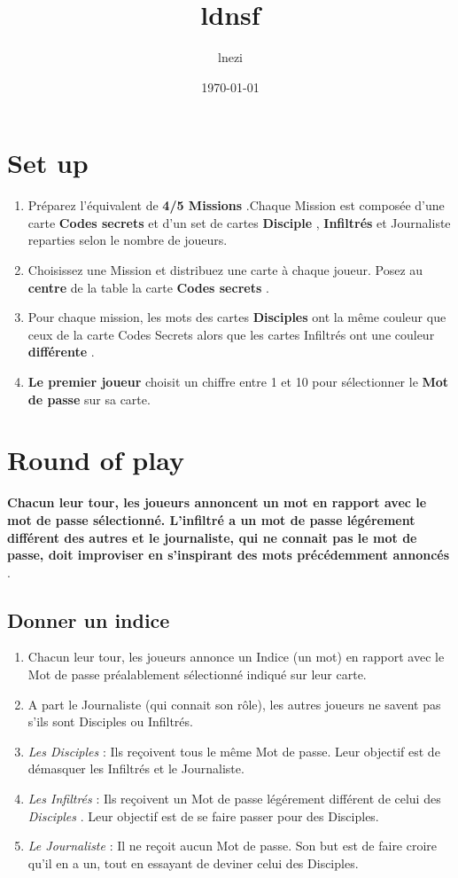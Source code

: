 \documentclass{article}%
\title{ldnsf}%
\author{lnezi}%
\date{\today}%
\begin{document}
%
\pagestyle{empty}%
\normalsize%
\maketitle%
\section{ Set up
}%
\label{sec:Setup}%
\begin{enumerate}%
\item%
%
 Préparez l'équivalent de  %
\textbf{4/5 Missions}%
.Chaque Mission est composée d'une carte %
\textbf{Codes secrets}%
 et d'un set de cartes  %
\textbf{Disciple}%
,%
\textbf{ Infiltrés}%
 et Journaliste reparties selon le nombre de joueurs.
\item%
%
 Choisissez une Mission et distribuez une carte à chaque joueur. Posez au  %
\textbf{centre}%
 de la table la carte  %
\textbf{Codes secrets}%
.
%
\item%
%
 Pour chaque mission, les mots des cartes  %
\textbf{Disciples}%
 ont la même couleur que ceux de la carte Codes Secrets alors que les cartes Infiltrés ont une couleur  %
\textbf{différente}%
.
%
\item%
%
\textbf{Le premier joueur}%
 choisit un chiffre entre 1 et 10 pour sélectionner le  %
\textbf{Mot de passe}%
 sur sa carte.
\end{enumerate}

%
\section{ Round of play
}%
\label{sec:Roundofplay}%
\textbf{Chacun leur tour, les joueurs annoncent un mot en rapport avec le mot de passe sélectionné. L'infiltré a un mot de passe légérement différent des autres et le journaliste, qui ne connait pas le mot de passe, doit improviser en s'inspirant des mots précédemment annoncés}%
.


%
\subsection{ Donner un indice
}%
\label{subsec:Donnerunindice}%
\begin{enumerate}%
\item%
%
 Chacun leur tour, les joueurs annonce un Indice (un mot) en rapport avec le Mot de passe préalablement sélectionné indiqué sur leur carte.
\item%
%
 A part le Journaliste (qui connait son rôle), les autres joueurs ne savent pas s'ils sont Disciples ou Infiltrés.
\item%
%
\textit{Les Disciples}%
 : Ils reçoivent tous le même Mot de passe. Leur objectif est de démasquer les Infiltrés et le Journaliste.
\item%
%
\textit{Les Infiltrés}%
 : Ils reçoivent un Mot de passe légérement différent de celui des  %
\textit{Disciples}%
. Leur objectif est de se faire passer pour des Disciples.
%
\item%
%
\textit{Le Journaliste}%
 : Il ne reçoit aucun Mot de passe. Son but est de faire croire qu'il en a un, tout en essayant de deviner celui des Disciples.
\end{enumerate}
\end{document}
